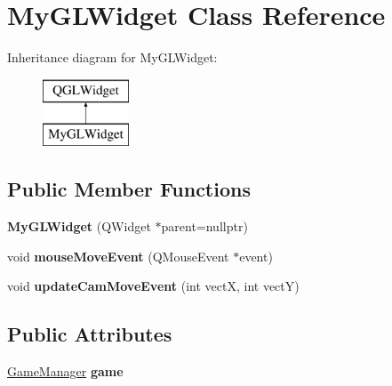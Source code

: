 \hypertarget{class_my_g_l_widget}{}\section{My\+G\+L\+Widget Class Reference}
\label{class_my_g_l_widget}
Inheritance diagram for My\+G\+L\+Widget\+:\begin{figure}[H]
\begin{center}
\leavevmode
\includegraphics[height=2.000000cm]{class_my_g_l_widget}
\end{center}
\end{figure}
\subsection*{Public Member Functions}
\begin{DoxyCompactItemize}
\item 
\mbox{\label{class_my_g_l_widget_a50dfc5ed9f6874956b09378e82265fda}} 
{\bfseries My\+G\+L\+Widget} (Q\+Widget $\ast$parent=nullptr)
\item 
\mbox{\label{class_my_g_l_widget_a519efceb466527b8730d82ee1a0da8fb}} 
void {\bfseries mouse\+Move\+Event} (Q\+Mouse\+Event $\ast$event)
\item 
\mbox{\label{class_my_g_l_widget_a3e963e10932c45bd4f95813bfa533bfc}} 
void {\bfseries update\+Cam\+Move\+Event} (int vectX, int vectY)
\end{DoxyCompactItemize}
\subsection*{Public Attributes}
\begin{DoxyCompactItemize}
\item 
\mbox{\label{class_my_g_l_widget_a10b11952a864dfa4827c97039f3313bf}} 
\mbox{\hyperlink{class_game_manager}{Game\+Manager}} {\bfseries game}
\end{DoxyCompactItemize}

